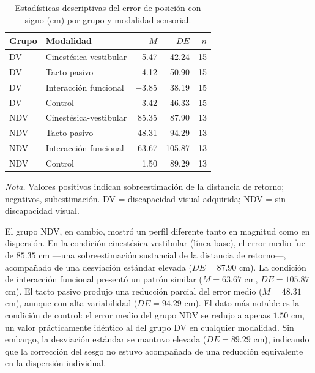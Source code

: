 \documentclass[12pt,letterpaper]{article}
\begin{document}
\begin{table}[H]
\centering
\caption{Estadísticas descriptivas del error de posición con signo (cm) por grupo y modalidad sensorial.}
\label{tab:descriptivos}
\begin{tabular}{llrrr}
\toprule
Grupo & Modalidad & $M$ & $DE$ & $n$ \\
\midrule
DV  & Cinestésica-vestibular & 5.47   & 42.24  & 15 \\
DV  & Tacto pasivo           & $-$4.12  & 50.90  & 15 \\
DV  & Interacción funcional  & $-$3.85  & 38.19  & 15 \\
DV  & Control                & 3.42   & 46.33  & 15 \\
\addlinespace
NDV & Cinestésica-vestibular & 85.35  & 87.90  & 13 \\
NDV & Tacto pasivo           & 48.31  & 94.29  & 13 \\
NDV & Interacción funcional  & 63.67  & 105.87 & 13 \\
NDV & Control                & 1.50   & 89.29  & 13 \\
\bottomrule
\end{tabular}

\vspace{0.3cm}
\small\textit{Nota.} Valores positivos indican sobreestimación de la distancia de retorno; negativos, subestimación. DV = discapacidad visual adquirida; NDV = sin discapacidad visual.
\end{table}

El grupo NDV, en cambio, mostró un perfil diferente tanto en magnitud como en dispersión. En la condición cinestésica-vestibular (línea base), el error medio fue de $85.35$ cm ---una sobreestimación sustancial de la distancia de retorno---, acompañado de una desviación estándar elevada ($DE = 87.90$ cm). La condición de interacción funcional presentó un patrón similar ($M = 63.67$ cm, $DE = 105.87$ cm). El tacto pasivo produjo una reducción parcial del error medio ($M = 48.31$ cm), aunque con alta variabilidad ($DE = 94.29$ cm). El dato más notable es la condición de control: el error medio del grupo NDV se redujo a apenas $1.50$ cm, un valor prácticamente idéntico al del grupo DV en cualquier modalidad. Sin embargo, la desviación estándar se mantuvo elevada ($DE = 89.29$ cm), indicando que la corrección del sesgo no estuvo acompañada de una reducción equivalente en la dispersión individual.
\end{document}
